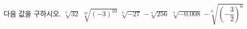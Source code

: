 다음 값을 구하시오.
 $\sqrt[5]{32}$
 $\sqrt[10]{(-3)^{10}}$
 $\sqrt[3]{-27}$
 $-\sqrt[4]{256}$
 $\sqrt[3]{-0.008}$
 $-\sqrt[6]{\left(-\dfrac{3}{2}\right)^{6}}$
